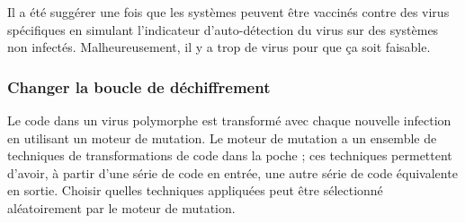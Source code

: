         Il a été suggérer une fois que les systèmes peuvent être vaccinés contre des virus spécifiques en simulant
        l'indicateur d'auto-détection du virus sur des systèmes non infectés. 
        Malheureusement, il y a trop de virus pour que ça soit faisable. \cite{virus} %

        \subsubsection{Changer la boucle de déchiffrement}
        Le code dans un virus polymorphe est transformé avec chaque nouvelle infection en utilisant un moteur de
        mutation. Le moteur de mutation a un ensemble de techniques de transformations de code dans la poche ; 
        ces techniques permettent d'avoir, à partir d'une série de code en entrée, une autre série de code 
        équivalente en sortie. Choisir quelles techniques appliquées peut être sélectionné aléatoirement 
        par le moteur de mutation. \cite{virus} %

